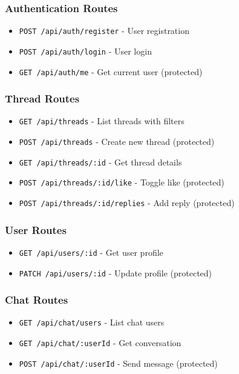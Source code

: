 \documentclass[11pt,a4paper]{article}
\begin{document}
\subsubsection{Authentication Routes}
\begin{itemize}[leftmargin=*]
    \item \texttt{POST /api/auth/register} - User registration
    \item \texttt{POST /api/auth/login} - User login
    \item \texttt{GET /api/auth/me} - Get current user (protected)
\end{itemize}

\subsubsection{Thread Routes}
\begin{itemize}[leftmargin=*]
    \item \texttt{GET /api/threads} - List threads with filters
    \item \texttt{POST /api/threads} - Create new thread (protected)
    \item \texttt{GET /api/threads/:id} - Get thread details
    \item \texttt{POST /api/threads/:id/like} - Toggle like (protected)
    \item \texttt{POST /api/threads/:id/replies} - Add reply (protected)
\end{itemize}

\subsubsection{User Routes}
\begin{itemize}[leftmargin=*]
    \item \texttt{GET /api/users/:id} - Get user profile
    \item \texttt{PATCH /api/users/:id} - Update profile (protected)
\end{itemize}

\subsubsection{Chat Routes}
\begin{itemize}[leftmargin=*]
    \item \texttt{GET /api/chat/users} - List chat users
    \item \texttt{GET /api/chat/:userId} - Get conversation
    \item \texttt{POST /api/chat/:userId} - Send message (protected)
\end{itemize}
\end{document}
